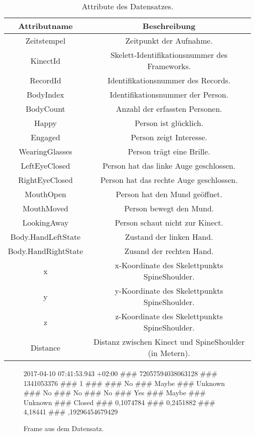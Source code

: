 \begin{table}[ht]
  \begin{center}
    \begin{tabular}{ |c|c| } 
      \hline
      Attributname & Beschreibung \\
      \hline \hline
      Zeitstempel & Zeitpunkt der Aufnahme. \\
      \hline
      KinectId & Skelett-Identifikationsnummer des Frameworks.  \\
      \hline
      RecordId & Identifikationsnummer des Records. \\
      \hline
      BodyIndex & Identifikationsnummer der Person. \\
      \hline
      BodyCount & Anzahl der erfassten Personen. \\
      \hline
      Happy & Person ist glücklich. \\
      \hline
      Engaged & Person zeigt Interesse. \\
      \hline
      WearingGlasses & Person trägt eine Brille. \\
      \hline
      LeftEyeClosed & Person hat das linke Auge geschlossen. \\
      \hline
      RightEyeClosed & Person hat das rechte Auge geschlossen. \\
      \hline
      MouthOpen & Person hat den Mund geöffnet. \\
      \hline
      MouthMoved & Person bewegt den Mund. \\
      \hline
      LookingAway & Person schaut nicht zur Kinect. \\
      \hline
      Body.HandLeftState & Zustand der linken Hand. \\
      \hline
      Body.HandRightState & Zusand der rechten Hand. \\
      \hline
      x & x-Koordinate des Skelettpunkts SpineShoulder. \\
      \hline
      y & y-Koordinate des Skelettpunkts SpineShoulder. \\
      \hline
      z & z-Koordinate des Skelettpunkts SpineShoulder. \\
      \hline
      Distance & Distanz zwischen Kinect und SpineShoulder (in Metern). \\
      \hline
    \end{tabular}
    \caption{Attribute des Datensatzes.}
    \label{tbl:AttributesDataset}
  \end{center}
\end{table}
\begin{center}
  \begin{figure}[ht]
    2017-04-10 07:41:53.943 +02:00 \#\#\# 72057594038063128 \#\#\# 1341053376 \#\#\# 1 \#\#\#
     \#\#\# No \#\#\# Maybe \#\#\# Unknown \#\#\# No \#\#\# No \#\#\# No \#\#\# Yes \#\#\#
    \newline Maybe \#\#\# Unknown \#\#\# Closed \#\#\# 0,1074784 \#\#\# 0,2451882 \#\#\# 4,18441 \#\#\#
    ,19296454679429
    \caption{Frame aus dem Datensatz.}
    \label{fig:FrameExample}
  \end{figure}
\end{center}

